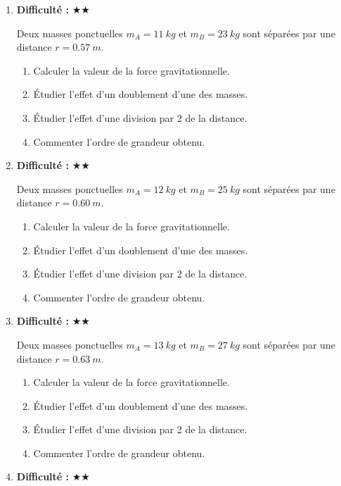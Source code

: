 \documentclass[11pt,a4paper]{article}
\newcommand{\etoiles}[1]{\textbf{Difficulté : }#1}
\begin{document}
\begin{enumerate}[label=\textbf{Exercice \arabic*.},leftmargin=*]
Deux masses ponctuelles $m_A=10\ \si{kg}$ et $m_B=21\ \si{kg}$ sont séparées par une distance $r=0.54\ \si{m}$.
\begin{enumerate}[label=\alph*)]
\item Calculer la valeur de la force gravitationnelle.
\item Étudier l'effet d'un doublement d'une des masses.
\item Étudier l'effet d'une division par 2 de la distance.
\item Commenter l'ordre de grandeur obtenu.
\end{enumerate}
\item \etoiles{★★}

Deux masses ponctuelles $m_A=11\ \si{kg}$ et $m_B=23\ \si{kg}$ sont séparées par une distance $r=0.57\ \si{m}$.
\begin{enumerate}[label=\alph*)]
\item Calculer la valeur de la force gravitationnelle.
\item Étudier l'effet d'un doublement d'une des masses.
\item Étudier l'effet d'une division par 2 de la distance.
\item Commenter l'ordre de grandeur obtenu.
\end{enumerate}
\item \etoiles{★★}

Deux masses ponctuelles $m_A=12\ \si{kg}$ et $m_B=25\ \si{kg}$ sont séparées par une distance $r=0.60\ \si{m}$.
\begin{enumerate}[label=\alph*)]
\item Calculer la valeur de la force gravitationnelle.
\item Étudier l'effet d'un doublement d'une des masses.
\item Étudier l'effet d'une division par 2 de la distance.
\item Commenter l'ordre de grandeur obtenu.
\end{enumerate}
\item \etoiles{★★}

Deux masses ponctuelles $m_A=13\ \si{kg}$ et $m_B=27\ \si{kg}$ sont séparées par une distance $r=0.63\ \si{m}$.
\begin{enumerate}[label=\alph*)]
\item Calculer la valeur de la force gravitationnelle.
\item Étudier l'effet d'un doublement d'une des masses.
\item Étudier l'effet d'une division par 2 de la distance.
\item Commenter l'ordre de grandeur obtenu.
\end{enumerate}
\item \etoiles{★★}


\end{enumerate}
\end{document}
